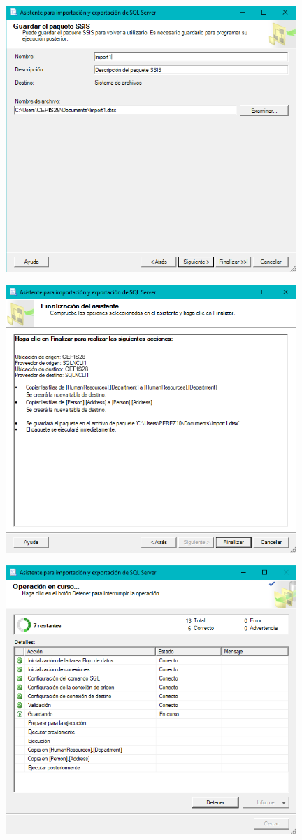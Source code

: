 	\begin{center}
	\includegraphics[width=11cm]{./Imagenes/img9}
	\end{center}	
	\begin{center}
	\includegraphics[width=11cm]{./Imagenes/img10}
	\end{center}	
	\begin{center}
	\includegraphics[width=11cm]{./Imagenes/img11}
	\end{center}	
